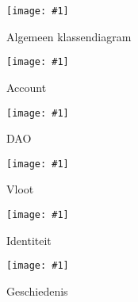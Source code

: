 \documentclass{article}
\newcommand{\diagram}[2]{
	\texttt{[image: \#1]}
	\caption{#2}
}
\newcommand{\vertdiagram}[2]{
	\begin{sidewaysfigure}
		\diagram{#1}{#2}
	\end{sidewaysfigure}
}
\begin{document}
	\vertdiagram{Klassediagram}{Algemeen klassendiagram}
	\vertdiagram{ClassDiagramAccount}{Account}
	\vertdiagram{ClassDiagramDAO}{DAO}
	\vertdiagram{ClassDiagramFleet}{Vloot}
	\vertdiagram{ClassDiagramIdentity}{Identiteit}
	\vertdiagram{HistoryClassDiagram}{Geschiedenis}
\end{document}
